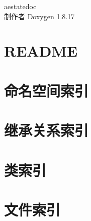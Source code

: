 \let\mypdfximage\pdfximage\def\pdfximage{\immediate\mypdfximage}\documentclass[twoside]{book}
\newcommand{\+}{\discretionary{\mbox{\scriptsize$\hookleftarrow$}}{}{}}
\newcommand{\clearemptydoublepage}{%
  \newpage{\pagestyle{empty}\cleardoublepage}%
}
\begin{document}
\begin{CJK}{UTF8}{min}

\hypersetup{pageanchor=false,
             bookmarksnumbered=true,
             pdfencoding=unicode
            }
\begin{titlepage}
\vspace*{7cm}
\begin{center}%
{\Large aestatedoc }\\
\vspace*{1cm}
{\large 制作者 Doxygen 1.8.17}\\
\end{center}
\end{titlepage}
\clearemptydoublepage
{}
\tableofcontents
\clearemptydoublepage
{}
\hypersetup{pageanchor=true}

\chapter{R\+E\+A\+D\+ME}
\label{md__home_cacode_桌面__aestate_framework__r_e_a_d_m_e}

\chapter{命名空间索引}

\chapter{继承关系索引}

\chapter{类索引}

\chapter{文件索引}


\end{CJK}
\end{document}
